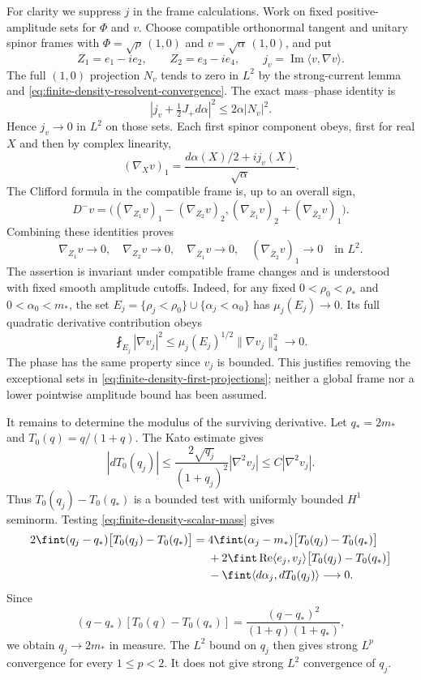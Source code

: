 For clarity we suppress $j$ in the frame calculations.  Work on fixed
positive-amplitude sets for $\Phi$ and $v$.  Choose compatible
orthonormal tangent and unitary spinor frames with
$\Phi=\sqrt\rho\,(1,0)$ and $v=\sqrt\alpha\,(1,0)$, and put
\[
 Z_1=e_1-ie_2,\qquad Z_2=e_3-ie_4,
 \qquad j_v=\operatorname{Im}\langle v,\nabla v\rangle.
\]
The full $(1,0)$ projection $N_v$ tends to zero in $L^2$ by the
strong-current lemma and \eqref{eq:finite-density-resolvent-convergence}.
The exact mass--phase identity is
\begin{equation}
 |j_v+\tfrac12J_+d\alpha|^2\le2\alpha|N_v|^2.
 \label{eq:finite-density-phase}
\end{equation}
Hence $j_v\to0$ in $L^2$ on those sets.  Each first spinor
component obeys, first for real $X$ and then by complex linearity,
\[
 (\nabla_Xv)_1
       =\frac{d\alpha(X)/2+ij_v(X)}{\sqrt\alpha}.
\]
The Clifford formula in the compatible frame is, up to an overall
sign,
\[
 D^-v=\bigl((\nabla_{Z_1}v)_1-(\nabla_{Z_2}v)_2,
            (\nabla_{\bar Z_1}v)_2+(\nabla_{\bar Z_2}v)_1\bigr).
\]
Combining these identities proves
\begin{equation}
 \nabla_{Z_1}v\longrightarrow0,\quad
 \nabla_{Z_2}v\longrightarrow0,\quad
 \nabla_{\bar Z_1}v\longrightarrow0,\quad
 (\nabla_{\bar Z_2}v)_1\longrightarrow0
       \quad\text{in }L^2.
 \label{eq:finite-density-first-projections}
\end{equation}
The assertion is invariant under compatible frame changes and is
understood with fixed smooth amplitude cutoffs.  Indeed, for any fixed
$0<\rho_0<\rho_*$ and $0<\alpha_0<m_*$, the set
$E_j=\{\rho_j<\rho_0\}\cup\{\alpha_j<\alpha_0\}$ has
$\mu_j(E_j)\to0$.  Its full quadratic derivative contribution obeys
\[
 \fint_{E_j}|\nabla v_j|^2
       \le\mu_j(E_j)^{1/2}\|\nabla v_j\|_4^2\longrightarrow0.
\]
The phase has the same property since $v_j$ is bounded.  This
justifies removing the exceptional sets in
\eqref{eq:finite-density-first-projections}; neither a global frame
nor a lower pointwise amplitude bound has been assumed.

It remains to determine the modulus of the surviving derivative.
Let $q_*=2m_*$ and $T_0(q)=q/(1+q)$.  The Kato estimate gives
\[
 |dT_0(q_j)|\le\frac{2\sqrt{q_j}}{(1+q_j)^2}|\nabla^2v_j|
       \le C|\nabla^2v_j|.
\]
Thus $T_0(q_j)-T_0(q_*)$ is a bounded test with uniformly bounded
$H^1$ seminorm.  Testing \eqref{eq:finite-density-scalar-mass} gives
\begin{align}
 2\fint(q_j-q_*)\bigl[T_0(q_j)-T_0(q_*)\bigr]
 ={}&4\fint(\alpha_j-m_*)\bigl[T_0(q_j)-T_0(q_*)\bigr]\notag\\
 &+2\fint\operatorname{Re}\langle e_j,v_j\rangle
                  \bigl[T_0(q_j)-T_0(q_*)\bigr]\notag\\
 &-\fint\langle d\alpha_j,dT_0(q_j)\rangle
       \longrightarrow0.
 \label{eq:finite-density-covariance}
\end{align}
Since
\[
 (q-q_*)[T_0(q)-T_0(q_*)]
       =\frac{(q-q_*)^2}{(1+q)(1+q_*)},
\]
we obtain $q_j\to2m_*$ in measure.  The $L^2$ bound on $q_j$
then gives strong $L^p$ convergence for every $1\le p<2$.
It does not give strong $L^2$ convergence of $q_j$.

